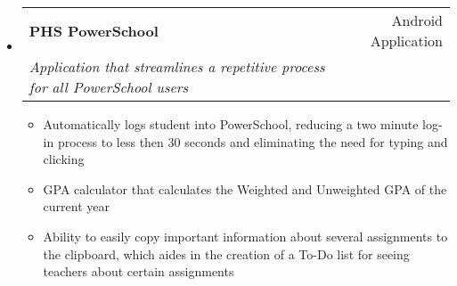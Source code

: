 \documentclass[letterpaper,11pt]{article}
\makeatletter
\newcommand{\resitem}[1]{\item #1 \vspace{-2pt}}
\newcommand{\ressubheading}[4]{
\begin{tabular*}{6.5in}{l@{\extracolsep{\fill}}r}
		\textbf{#1} & #2 \\
		\textit{#3} & \textit{#4} \\
\end{tabular*}\vspace{-6pt}}
\makeatother
\begin{document}
\begin{itemize}
\item
	\ressubheading{PHS PowerSchool}{Android Application}{Application that streamlines a repetitive process for all PowerSchool users}{}
	\begin{itemize}
		\resitem{Automatically logs student into PowerSchool, reducing a two minute log-in process to less then 30 seconds and eliminating the need for typing and clicking}
		\resitem{GPA calculator that calculates the Weighted and Unweighted GPA of the current year}
		\resitem{Ability to easily copy important information about several assignments to the clipboard, which aides in the creation of a To-Do list for seeing teachers about certain assignments}
	\end{itemize}
\end{itemize}
\end{document}
